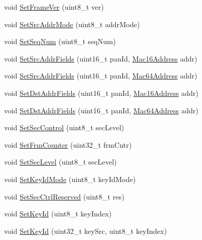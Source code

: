 \begin{DoxyCompactItemize}
\item 
void \hyperlink{classns3_1_1LrWpanMacHeader_ad55a0aee08a4959b52fd3ea931c770a7}{Set\+Frame\+Ver} (uint8\+\_\+t ver)
\item 
void \hyperlink{classns3_1_1LrWpanMacHeader_a3e0400af0ee70cf00d6d1373d9b02bc9}{Set\+Src\+Addr\+Mode} (uint8\+\_\+t addr\+Mode)
\item 
void \hyperlink{classns3_1_1LrWpanMacHeader_a2f946242c5789121b782598374d6e213}{Set\+Seq\+Num} (uint8\+\_\+t seq\+Num)
\item 
void \hyperlink{classns3_1_1LrWpanMacHeader_a5539aecd5c677aabf7e8040596dcbbc4}{Set\+Src\+Addr\+Fields} (uint16\+\_\+t pan\+Id, \hyperlink{classns3_1_1Mac16Address}{Mac16\+Address} addr)
\item 
void \hyperlink{classns3_1_1LrWpanMacHeader_a3f544d79a52cc1d79c98ee4907a6c334}{Set\+Src\+Addr\+Fields} (uint16\+\_\+t pan\+Id, \hyperlink{classns3_1_1Mac64Address}{Mac64\+Address} addr)
\item 
void \hyperlink{classns3_1_1LrWpanMacHeader_a7e24381d259bd877cf8f44fc10524272}{Set\+Dst\+Addr\+Fields} (uint16\+\_\+t pan\+Id, \hyperlink{classns3_1_1Mac16Address}{Mac16\+Address} addr)
\item 
void \hyperlink{classns3_1_1LrWpanMacHeader_aa3da01b62ffe846f3119caa8b2d914c2}{Set\+Dst\+Addr\+Fields} (uint16\+\_\+t pan\+Id, \hyperlink{classns3_1_1Mac64Address}{Mac64\+Address} addr)
\item 
void \hyperlink{classns3_1_1LrWpanMacHeader_afc011e4495becd4eaa625bfa155e19eb}{Set\+Sec\+Control} (uint8\+\_\+t sec\+Level)
\item 
void \hyperlink{classns3_1_1LrWpanMacHeader_a8c740a5bec7f351586764fac9e2ced21}{Set\+Frm\+Counter} (uint32\+\_\+t frm\+Cntr)
\item 
void \hyperlink{classns3_1_1LrWpanMacHeader_abae4484223c40d403d327cd0a2816f38}{Set\+Sec\+Level} (uint8\+\_\+t sec\+Level)
\item 
void \hyperlink{classns3_1_1LrWpanMacHeader_a1b73b6f22b82f9d3d0ed1baf50b9a02f}{Set\+Key\+Id\+Mode} (uint8\+\_\+t key\+Id\+Mode)
\item 
void \hyperlink{classns3_1_1LrWpanMacHeader_aab2393c4940742f0ef84c63173c3e538}{Set\+Sec\+Ctrl\+Reserved} (uint8\+\_\+t res)
\item 
void \hyperlink{classns3_1_1LrWpanMacHeader_acbeff58b9b69d5efdab7f3638e05f408}{Set\+Key\+Id} (uint8\+\_\+t key\+Index)
\item 
void \hyperlink{classns3_1_1LrWpanMacHeader_af05c8b2c481f555fef700ede39eec158}{Set\+Key\+Id} (uint32\+\_\+t key\+Src, uint8\+\_\+t key\+Index)

\end{DoxyCompactItemize}
